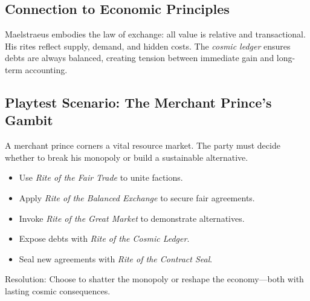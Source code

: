 \subsection*{Connection to Economic Principles}
Maelstraeus embodies the law of exchange: all value is relative and transactional. His rites reflect supply, demand, and hidden costs. The \emph{cosmic ledger} ensures debts are always balanced, creating tension between immediate gain and long-term accounting.

\subsection*{Playtest Scenario: The Merchant Prince's Gambit}
A merchant prince corners a vital resource market. The party must decide whether to break his monopoly or build a sustainable alternative.  

\begin{itemize}
\item Use \emph{Rite of the Fair Trade} to unite factions.  
\item Apply \emph{Rite of the Balanced Exchange} to secure fair agreements.  
\item Invoke \emph{Rite of the Great Market} to demonstrate alternatives.  
\item Expose debts with \emph{Rite of the Cosmic Ledger}.  
\item Seal new agreements with \emph{Rite of the Contract Seal}.  
\end{itemize}

Resolution: Choose to shatter the monopoly or reshape the economy---both with lasting cosmic consequences.
